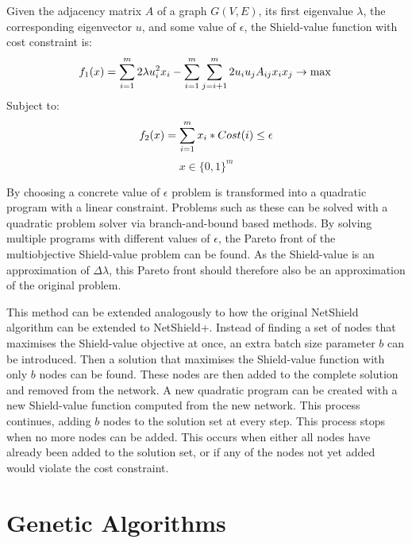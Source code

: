 \documentclass{svproc}
\begin{document}
\begin{definition}
Given the adjacency matrix $A$ of a graph $G(V,E)$, its first eigenvalue $\lambda$, the corresponding eigenvector $u$, and some value of $\epsilon$, the Shield-value function with cost constraint is:
\begin{equation}
    f_{1}(x) = \sum_{i=1}^{m} 2 \lambda  u_{i}^{2} x_{i} - \sum_{i=1}^{m} \sum_{j=i+1}^{m} 2 u_{i} u_{j} A_{ij} x_{i} x_{j} \to \max \\
\end{equation}
Subject to:
\begin{equation}
    f_{2}(x) = \sum_{i=1}^{m} x_{i} * Cost(i) \leq \epsilon \\
\end{equation}
\begin{equation}
    x \in \{0,1\}^{m}
\end{equation}
\end{definition}

By choosing a concrete value of $\epsilon$ problem is transformed into a quadratic program with a linear constraint. Problems such as these can be solved with a quadratic problem solver via branch-and-bound based methods. By solving multiple programs with different values of $\epsilon$, the Pareto front of the multiobjective Shield-value problem can be found. As the Shield-value is an approximation of $\Delta\lambda$, this Pareto front should therefore also be an approximation of the original problem.

This method can be extended analogously to how the original NetShield algorithm can be extended to NetShield+. Instead of finding a set of nodes that maximises the Shield-value objective at once, an extra batch size parameter $b$ can be introduced. Then a solution that maximises the Shield-value function with only $b$ nodes can be found. These nodes are then added to the complete solution and removed from the network. A new quadratic program can be created with a new Shield-value function computed from the new network. This process continues, adding $b$ nodes to the solution set at every step. This process stops when no more nodes can be added. This occurs when either all nodes have already been added to the solution set, or if any of the nodes not yet added would violate the cost constraint. 


\section{Genetic Algorithms}
\end{document}
